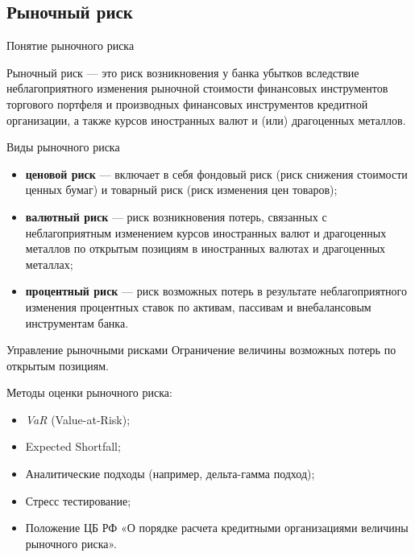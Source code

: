 \documentclass[financial_risks_lectures.tex]{subfiles}
\begin{document}
\subsection{Рыночный риск}
\begin{frame}{Понятие рыночного риска}
\begin{block}{Рыночный риск }
\quad — это риск возникновения у банка убытков вследствие неблагоприятного изменения рыночной стоимости финансовых инструментов торгового портфеля и производных финансовых инструментов кредитной организации, а также курсов иностранных валют и (или) драгоценных металлов.
\end{block}
\end{frame}
\begin{frame}{Виды рыночного риска}
\begin{itemize}[<+->]
\item
\textbf{ценовой риск }— включает в себя фондовый риск (риск снижения стоимости ценных бумаг) и товарный риск (риск изменения цен товаров);
\item
\textbf{валютный риск }— риск возникновения потерь, связанных с неблагоприятным изменением курсов иностранных валют и драгоценных металлов по открытым позициям в иностранных валютах и драгоценных металлах;
\item
\textbf{процентный риск }— риск возможных потерь в результате неблагоприятного изменения процентных ставок по активам, пассивам и внебалансовым инструментам банка.
\end{itemize}
\end{frame}

\begin{frame}{Управление рыночными рисками}
Ограничение величины возможных потерь по открытым позициям.

Методы оценки рыночного риска:
\begin{itemize}
\item
\textit{VaR }(Value-at-Risk);
\item
Expected Shortfall;
\item
Аналитические подходы (например, дельта-гамма подход);
\item
Стресс тестирование;
\item
Положение ЦБ РФ «О порядке расчета кредитными организациями величины рыночного риска».
\end{itemize}
\end{frame}
\end{document}

